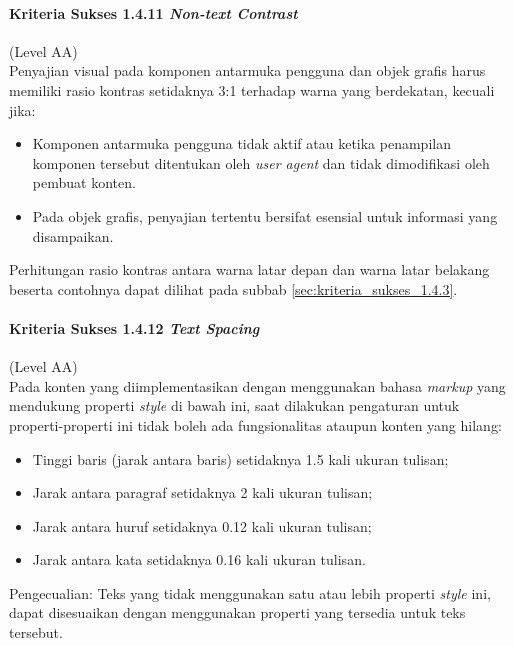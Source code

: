 \paragraph{Kriteria Sukses 1.4.11 \textit{Non-text Contrast}}
\label{sec:kriteria_sukses_1.4.11}
(Level AA)\\

Penyajian visual pada komponen antarmuka pengguna dan objek grafis harus memiliki rasio kontras setidaknya 3:1 terhadap warna yang berdekatan, kecuali jika:

\begin{itemize}
	\item Komponen antarmuka pengguna tidak aktif atau ketika penampilan komponen tersebut ditentukan oleh \textit{user agent} dan tidak dimodifikasi oleh pembuat konten.
	\item Pada objek grafis, penyajian tertentu bersifat esensial untuk informasi yang disampaikan.
\end{itemize}

Perhitungan rasio kontras antara warna latar depan dan warna latar belakang beserta contohnya dapat dilihat pada subbab \ref{sec:kriteria_sukses_1.4.3}.

\paragraph{Kriteria Sukses 1.4.12 \textit{Text Spacing}}
\label{sec:kriteria_sukses_1.4.12}
(Level AA)\\

Pada konten yang diimplementasikan dengan menggunakan bahasa \textit{markup} yang mendukung properti \textit{style} di bawah ini, saat dilakukan pengaturan untuk properti-properti ini tidak boleh ada fungsionalitas ataupun konten yang hilang:

\begin{itemize}
	\item Tinggi baris (jarak antara baris) setidaknya 1.5 kali ukuran tulisan;
	\item Jarak antara paragraf setidaknya 2 kali ukuran tulisan;
	\item Jarak antara huruf setidaknya 0.12 kali ukuran tulisan;
	\item Jarak antara kata setidaknya 0.16 kali ukuran tulisan.
\end{itemize}

Pengecualian: Teks yang tidak menggunakan satu atau lebih properti \textit{style} ini, dapat disesuaikan dengan menggunakan properti yang tersedia untuk teks tersebut.

